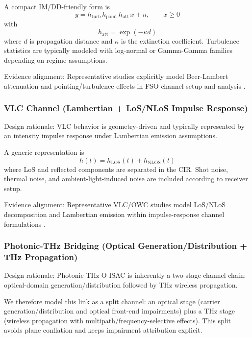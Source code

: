 \documentclass[lettersize,journal]{IEEEtran}
\begin{document}
A compact IM/DD-friendly form is
\begin{equation}
y = h_{\text{turb}}\,h_{\text{point}}\,h_{\text{att}}\,x + n,\qquad x\ge 0
\end{equation}
with
\begin{equation}
h_{\text{att}}=\exp(-\kappa d)
\end{equation}
where \(d\) is propagation distance and \(\kappa\) is the extinction coefficient. Turbulence statistics are typically modeled with log-normal or Gamma-Gamma families depending on regime assumptions.

Evidence alignment: Representative studies explicitly model Beer-Lambert attenuation and pointing/turbulence effects in FSO channel setup and analysis \cite{O_ISAC_035,O_ISAC_005}.

\subsubsection{VLC Channel (Lambertian + LoS/NLoS Impulse Response)}
Design rationale: VLC behavior is geometry-driven and typically represented by an intensity impulse response under Lambertian emission assumptions.

A generic representation is
\begin{equation}
h(t)=h_{\text{LOS}}(t)+h_{\text{NLOS}}(t)
\end{equation}
where LoS and reflected components are separated in the CIR. Shot noise, thermal noise, and ambient-light-induced noise are included according to receiver setup.

Evidence alignment: Representative VLC/OWC studies model LoS/NLoS decomposition and Lambertian emission within impulse-response channel formulations \cite{O_ISAC_039,O_ISAC_022}.

\subsubsection{Photonic-THz Bridging (Optical Generation/Distribution + THz Propagation)}
Design rationale: Photonic-THz O-ISAC is inherently a two-stage channel chain: optical-domain generation/distribution followed by THz wireless propagation.

We therefore model this link as a split channel: an optical stage (carrier generation/distribution and optical front-end impairments) plus a THz stage (wireless propagation with multipath/frequency-selective effects). This split avoids plane conflation and keeps impairment attribution explicit.
\end{document}
